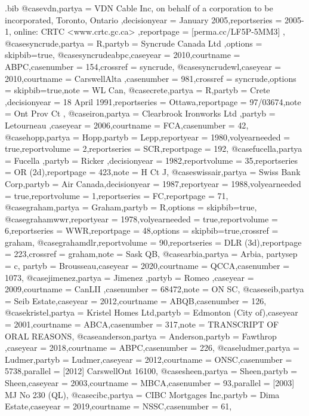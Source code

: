 \begin{filecontents*}[overwrite]{\jobname.bib}
@case{vdn,partya = {VDN Cable Inc, on behalf of a corporation to be incorporated, Toronto, Ontario },decisionyear = {January 2005},reportseries = {2005-1, online: CRTC <www.crtc.gc.ca> },reportpage = {[perma.cc/LF5P-5MM3] },}
@case{syncrude,partya = {R},partyb = {Syncrude Canada Ltd },options = {skipbib=true},}
@case{syncrudeabpc,caseyear = {2010},courtname = {ABPC},casenumber = {154},crossref = {syncrude},}
@case{syncrudewl,caseyear = {2010},courtname = {CarswellAlta },casenumber = {981},crossref = {syncrude},options = {skipbib=true},note = {WL Can},}
@case{crete,partya = {R},partyb = {Crete },decisionyear = {18 April 1991},reportseries = {Ottawa},reportpage = {97/03674},note = {Ont Prov Ct },}
@case{iron,partya = {Clearbrook Ironworks Ltd },partyb = {Letourneau },caseyear = {2006},courtname = {FCA},casenumber = {42},}
@case{hopp,partya = {Hopp},partyb = {Lepp},reportyear = {1980},volyearneeded = {true},reportvolume = {2},reportseries = {SCR},reportpage = {192},}
@case{fucella,partya = {Fucella },partyb = {Ricker },decisionyear = {1982},reportvolume = {35},reportseries = {OR (2d)},reportpage = {423},note = {H Ct J},}
@case{swissair,partya = {Swiss Bank Corp},partyb = {Air Canada},decisionyear = {1987},reportyear = {1988},volyearneeded = {true},reportvolume = {1},reportseries = {FC},reportpage = {71},}
@case{graham,partya = {Graham},partyb = {R},options = {skipbib=true},}
@case{grahamwwr,reportyear = {1978},volyearneeded = {true},reportvolume = {6},reportseries = {WWR},reportpage = {48},options = {skipbib=true},crossref = {graham},}
@case{grahamdlr,reportvolume = {90},reportseries = {DLR (3d)},reportpage = {223},crossref = {graham},note = {Sask QB},}
@case{arbia,partya = {Arbia},
partysep = {c},
partyb = {Brousseau},caseyear = {2020},courtname = {QCCA},casenumber = {1073},}
@case{jimenez,partya = {Jimenez },partyb = {Romeo },caseyear = {2009},courtname = {CanLII },casenumber = {68472},note = {ON SC},}
@case{seib,partya = {Seib Estate},caseyear = {2012},courtname = {ABQB},casenumber = {126},}
@case{kristel,partya = {Kristel Homes Ltd},partyb = {Edmonton (City of)},caseyear = {2001},courtname = {ABCA},casenumber = {317},note = {TRANSCRIPT OF ORAL REASONS},}
@case{anderson,partya = {Anderson},partyb = {Fawthrop },caseyear = {2018},courtname = {ABPC},casenumber = {226},}
@case{ludmer,partya = {Ludmer},partyb = {Ludmer},caseyear = {2012},courtname = {ONSC},casenumber = {5738},parallel = {[2012] CarswellOnt 16100},}
@case{sheen,partya = {Sheen},partyb = {Sheen},caseyear = {2003},courtname = {MBCA},casenumber = {93},parallel = {[2003] MJ No 230 (QL)},}
@case{cibc,partya = {CIBC Mortgages Inc},partyb = {Dima Estate},caseyear = {2019},courtname = {NSSC},casenumber = {61},}

\end{filecontents*}
